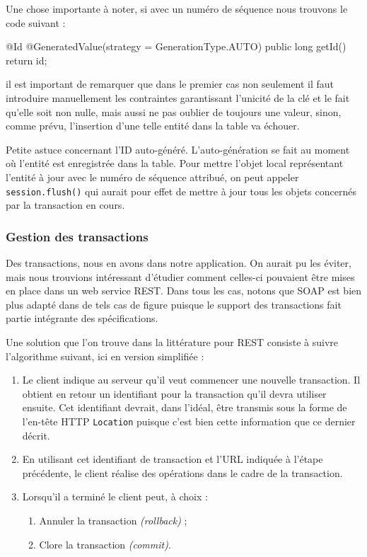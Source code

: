 Une chose importante à noter, si avec un numéro de séquence nous trouvons le code suivant :

\begin{javacode}
    @Id
    @GeneratedValue(strategy = GenerationType.AUTO)
    public long getId() {
        return id;
    }
\end{javacode}

il est important de remarquer que dans le premier cas non seulement il faut introduire manuellement
les contraintes garantissant l'unicité de la clé et le fait qu'elle soit non nulle, mais aussi ne pas oublier
de toujours  une valeur, sinon, comme prévu, l'insertion d'une telle entité dans la 
table va échouer.

Petite astuce concernant l'ID auto-généré. L'auto-génération se fait au moment où l'entité est enregistrée
dans la table. Pour mettre l'objet local représentant l'entité à jour avec le numéro de séquence attribué,
on peut appeler \verb|session.flush()| qui aurait pour effet de mettre à jour tous les objets concernés
par la transaction en cours.

\subsubsection{Gestion des transactions}

Des transactions, nous en avons dans notre application. On aurait pu les éviter,
mais nous trouvions intéressant d'étudier comment celles-ci pouvaient être mises en place dans un web service REST.
Dans tous les cas, notons que SOAP est bien plus adapté dans de tels cas de figure puisque le support des transactions
fait partie intégrante des spécifications.

Une solution que l'on trouve dans la littérature pour REST consiste à suivre l'algorithme suivant, 
ici en version simplifiée :

\begin{enumerate}
    \item Le client indique au serveur qu'il veut commencer une nouvelle transaction. Il obtient en retour
          un identifiant pour la transaction qu'il devra utiliser ensuite. Cet identifiant devrait, dans l'idéal,
          être transmis sous la forme de l'en-tête HTTP \verb|Location| puisque c'est bien cette information
          que ce dernier décrit.
    \item En utilisant cet identifiant de transaction et l'URL indiquée à l'étape précédente, le client
          réalise des opérations dans le cadre de la transaction.
    \item Lorsqu'il a terminé le client peut, à choix :
    \begin{enumerate}[label=\alph*]
        \item Annuler la transaction \emph{(rollback)} ;
        \item Clore la transaction   \emph{(commit)}.
    \end{enumerate}
\end{enumerate}

